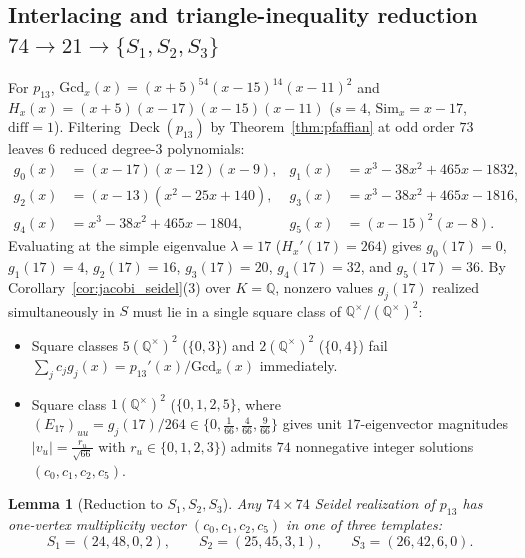 \documentclass[11pt,reqno]{amsart}
\newtheorem{lemma}[theorem]{Lemma}
\theoremstyle{definition}
\theoremstyle{remark}
\numberwithin{equation}{section}
\numberwithin{table}{section}
\DeclareMathOperator{\Deck}{Deck}
\begin{document}
\subsection{Interlacing and triangle-inequality reduction \texorpdfstring{$74 \to 21 \to \{S_1, S_2, S_3\}$}{74 -> 21 -> {S1, S2, S3}}}
For $p_{13}$, $\mathrm{Gcd}_x(x) = (x+5)^{54}(x-15)^{14}(x-11)^2$ and $H_x(x) = (x+5)(x-17)(x-15)(x-11)$ ($s = 4$, $\mathrm{Sim}_x = x - 17$, $\mathrm{diff} = 1$). Filtering $\Deck(p_{13})$ by Theorem~\ref{thm:pfaffian} at odd order $73$ leaves $6$ reduced degree-$3$ polynomials:
\begin{align*}
  g_0(x) &= (x - 17)(x - 12)(x - 9), & g_1(x) &= x^3 - 38x^2 + 465x - 1832, \\
  g_2(x) &= (x - 13)(x^2 - 25x + 140), & g_3(x) &= x^3 - 38x^2 + 465x - 1816, \\
  g_4(x) &= x^3 - 38x^2 + 465x - 1804, & g_5(x) &= (x - 15)^2(x - 8).
\end{align*}
Evaluating at the simple eigenvalue $\lambda = 17$ ($H_x'(17) = 264$) gives $g_0(17) = 0$, $g_1(17) = 4$, $g_2(17) = 16$, $g_3(17) = 20$, $g_4(17) = 32$, and $g_5(17) = 36$. By Corollary~\ref{cor:jacobi_seidel}(3) over $K = \mathbb{Q}$, nonzero values $g_j(17)$ realized simultaneously in $S$ must lie in a single square class of $\mathbb{Q}^\times / (\mathbb{Q}^\times)^2$:
\begin{itemize}
  \item Square classes $5(\mathbb{Q}^\times)^2$ ($\{0, 3\}$) and $2(\mathbb{Q}^\times)^2$ ($\{0, 4\}$) fail $\sum_j c_j g_j(x) = p_{13}'(x)/\mathrm{Gcd}_x(x)$ immediately.
  \item Square class $1(\mathbb{Q}^\times)^2$ ($\{0, 1, 2, 5\}$, where $(E_{17})_{uu} = g_j(17)/264 \in \{0, \frac{1}{66}, \frac{4}{66}, \frac{9}{66}\}$ gives unit $17$-eigenvector magnitudes $|v_u| = \frac{r_u}{\sqrt{66}}$ with $r_u \in \{0, 1, 2, 3\}$) admits $74$ nonnegative integer solutions $(c_0, c_1, c_2, c_5)$.
\end{itemize}

\begin{lemma}[Reduction to $S_1, S_2, S_3$]\label{lem:idx13_74to3}
Any $74 \times 74$ Seidel realization of $p_{13}$ has one-vertex multiplicity vector $(c_0, c_1, c_2, c_5)$ in one of three templates:
\[
  S_1 = (24, 48, 0, 2), \qquad S_2 = (25, 45, 3, 1), \qquad S_3 = (26, 42, 6, 0).
\]
\end{lemma}
\end{document}

